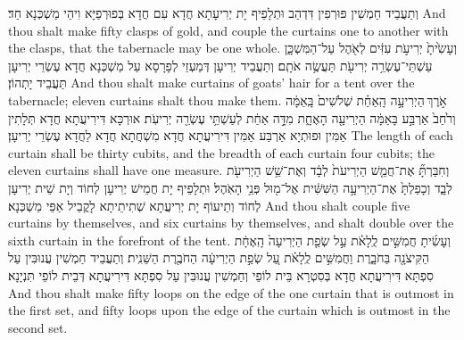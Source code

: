 {וְתַעֲבֵיד חַמְשִׁין פּוּרְפִין דִּדְהַב וּתְלָפֵיף יָת יְרִיעָתָא חֲדָא עִם חֲדָא בְּפוּרְפַיָּא וִיהֵי מַשְׁכְּנָא חַד׃}
{And thou shalt make fifty clasps of gold, and couple the curtains one to another with the clasps, that the tabernacle may be one whole.}{}
{וְעָשִׂ֙יתָ֙ יְרִיעֹ֣ת עִזִּ֔ים לְאֹ֖הֶל עַל־הַמִּשְׁכָּ֑ן עַשְׁתֵּי־עֶשְׂרֵ֥ה יְרִיעֹ֖ת תַּעֲשֶׂ֥ה אֹתָֽם׃
}
{וְתַעֲבֵיד יְרִיעָן דְּמַעְזֵי לְפָרָסָא עַל מַשְׁכְּנָא חֲדָא עֶשְׂרֵי יְרִיעָן תַּעֲבֵיד יָתְהוֹן׃}
{And thou shalt make curtains of goats’ hair for a tent over the tabernacle; eleven curtains shalt thou make them.}{}
{אֹ֣רֶךְ \legarmeh  הַיְרִיעָ֣ה הָֽאַחַ֗ת שְׁלֹשִׁים֙ בָּֽאַמָּ֔ה וְרֹ֙חַב֙ אַרְבַּ֣ע בָּאַמָּ֔ה הַיְרִיעָ֖ה הָאֶחָ֑ת מִדָּ֣ה אַחַ֔ת לְעַשְׁתֵּ֥י עֶשְׂרֵ֖ה יְרִיעֹֽת׃
}
{אוּרְכָּא דִּירִיעֲתָא חֲדָא תְּלָתִין אַמִּין וּפוּתְיָא אַרְבַּע אַמִּין דִּירִיעֲתָא חֲדָא מִשְׁחֲתָא חֲדָא לַחֲדָא עֶשְׂרֵי יְרִיעָן׃}
{The length of each curtain shall be thirty cubits, and the breadth of each curtain four cubits; the eleven curtains shall have one measure.}{}
{וְחִבַּרְתָּ֞ אֶת־חֲמֵ֤שׁ הַיְרִיעֹת֙ לְבָ֔ד וְאֶת־שֵׁ֥שׁ הַיְרִיעֹ֖ת לְבָ֑ד וְכָפַלְתָּ֙ אֶת־הַיְרִיעָ֣ה הַשִּׁשִּׁ֔ית אֶל־מ֖וּל פְּנֵ֥י הָאֹֽהֶל׃
}
{וּתְלָפֵיף יָת חֲמֵישׁ יְרִיעָן לְחוֹד וְיָת שֵׁית יְרִיעָן לְחוֹד וְתֵיעוֹף יָת יְרִיעֲתָא שְׁתִיתֵיתָא לָקֳבֵיל אַפֵּי מַשְׁכְּנָא׃}
{And thou shalt couple five curtains by themselves, and six curtains by themselves, and shalt double over the sixth curtain in the forefront of the tent.}{}
{וְעָשִׂ֜יתָ חֲמִשִּׁ֣ים לֻֽלָאֹ֗ת עַ֣ל שְׂפַ֤ת הַיְרִיעָה֙ הָֽאֶחָ֔ת הַקִּיצֹנָ֖ה בַּחֹבָ֑רֶת וַחֲמִשִּׁ֣ים לֻֽלָאֹ֗ת עַ֚ל שְׂפַ֣ת הַיְרִיעָ֔ה הַחֹבֶ֖רֶת הַשֵּׁנִֽית׃}
{וְתַעֲבֵיד חַמְשִׁין עֲנוּבִּין עַל סִפְתָּא דִּירִיעֲתָא חֲדָא בְּסִטְרָא בֵּית לוֹפֵי וְחַמְשִׁין עֲנוּבִּין עַל סִפְתָּא דִּירִיעֲתָא דְּבֵית לוֹפֵי תִּנְיָנָא׃}
{And thou shalt make fifty loops on the edge of the one curtain that is outmost in the first set, and fifty loops upon the edge of the curtain which is outmost in the second set.}{}
